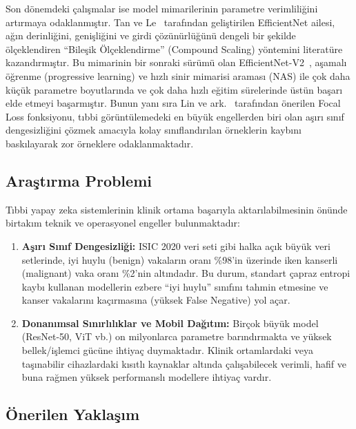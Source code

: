 \documentclass[12pt,a4paper]{article}
\begin{document}
Son dönemdeki çalışmalar ise model mimarilerinin parametre verimliliğini artırmaya odaklanmıştır. Tan ve Le~\cite{tan2019} tarafından geliştirilen EfficientNet ailesi, ağın derinliğini, genişliğini ve girdi çözünürlüğünü dengeli bir şekilde ölçeklendiren ``Bileşik Ölçeklendirme'' (Compound Scaling) yöntemini literatüre kazandırmıştır. Bu mimarinin bir sonraki sürümü olan EfficientNet-V2~\cite{tan2021}, aşamalı öğrenme (progressive learning) ve hızlı sinir mimarisi araması (NAS) ile çok daha küçük parametre boyutlarında ve çok daha hızlı eğitim sürelerinde üstün başarı elde etmeyi başarmıştır. Bunun yanı sıra Lin ve ark.~\cite{lin2017} tarafından önerilen Focal Loss fonksiyonu, tıbbi görüntülemedeki en büyük engellerden biri olan aşırı sınıf dengesizliğini çözmek amacıyla kolay sınıflandırılan örneklerin kaybını baskılayarak zor örneklere odaklanmaktadır.

\subsection{Araştırma Problemi}
\label{subsec:problem}

Tıbbi yapay zeka sistemlerinin klinik ortama başarıyla aktarılabilmesinin önünde birtakım teknik ve operasyonel engeller bulunmaktadır:
\begin{enumerate}
    \item \textbf{Aşırı Sınıf Dengesizliği:} ISIC 2020 veri seti gibi halka açık büyük veri setlerinde, iyi huylu (benign) vakaların oranı \%98'in üzerinde iken kanserli (malignant) vaka oranı \%2'nin altındadır. Bu durum, standart çapraz entropi kaybı kullanan modellerin ezbere ``iyi huylu'' sınıfını tahmin etmesine ve kanser vakalarını kaçırmasına (yüksek False Negative) yol açar.
    \item \textbf{Donanımsal Sınırlılıklar ve Mobil Dağıtım:} Birçok büyük model (ResNet-50, ViT vb.) on milyonlarca parametre barındırmakta ve yüksek bellek/işlemci gücüne ihtiyaç duymaktadır. Klinik ortamlardaki veya taşınabilir cihazlardaki kısıtlı kaynaklar altında çalışabilecek verimli, hafif ve buna rağmen yüksek performanslı modellere ihtiyaç vardır.
\end{enumerate}

\subsection{Önerilen Yaklaşım}
\label{subsec:yaklasim}
\end{document}
